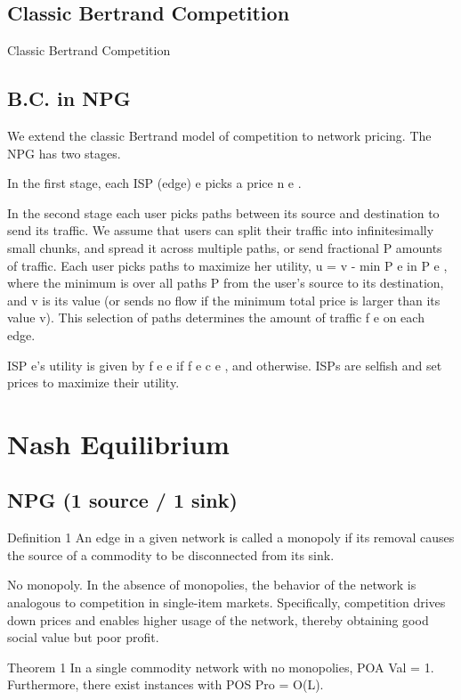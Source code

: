 \documentclass{beamer}
\begin{document}
\subsection{Classic Bertrand Competition}

\begin{frame}{Classic Bertrand Competition}

\end{frame}


\subsection{B.C. in NPG}

\begin{frame}
We extend the classic Bertrand model of competition to network pricing. The
NPG has two stages.

In the first stage, each ISP (edge) e picks a price n e .

In the second stage each user picks paths between its source and destination to send
its traffic. We assume that users can split their traffic into infinitesimally small
chunks, and spread it across multiple paths, or send fractional
P amounts of traffic.
Each user picks paths to maximize her utility, u = v - min P e in P e , where the
minimum is over all paths P from the user’s source to its destination, and v is
its value (or sends no flow if the minimum total price is larger than its value v).
This selection of paths determines the amount of traffic f e on each edge.

ISP e’s
utility is given by f e e if f e  c e , and  otherwise. ISPs are selfish and set
prices to maximize their utility.
\end{frame}


\section{Nash Equilibrium}

\subsection{NPG (1 source / 1 sink)}

\begin{frame}
\begin{exampleblock}{Definition 1}
An edge in a given network is called a monopoly if its removal
causes the source of a commodity to be disconnected from its sink.
\end{exampleblock}


No monopoly. In the absence of monopolies, the behavior of the network is
analogous to competition in single-item markets. Specifically, competition drives
down prices and enables higher usage of the network, thereby obtaining good
social value but poor profit.

\begin{block}{Theorem 1}
In a single commodity network with no monopolies, POA Val = 1.
Furthermore, there exist instances with POS Pro = O(L).
\end{block}

\end{frame}
\end{document}
